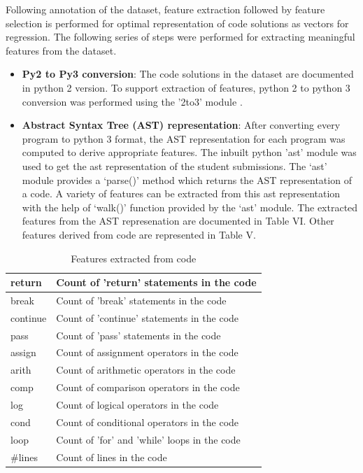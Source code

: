 \documentclass[conference]{IEEEtran}
\begin{document}
Following annotation of the dataset, feature extraction followed by feature selection is performed for optimal representation of code solutions as vectors for regression. The following series of steps were performed for extracting meaningful features from the dataset.

\begin{itemize}
        \item \textbf{Py2 to Py3 conversion}: The code solutions in the dataset are documented in python 2 version. To support extraction of features, python 2 to python 3 conversion was performed using the '2to3' module \cite{G}.
        \item \textbf{Abstract Syntax Tree (AST) representation}: After converting every program to python 3 format, the AST \cite{F} representation for each program was computed to derive appropriate features. The inbuilt python 'ast' module was used to get the ast representation of the student submissions. The ‘ast’ module provides a ‘parse()’ method which returns the AST representation of a code. A variety of features can be extracted from this ast representation with the help of ‘walk()’ function provided by the ‘ast’ module. The extracted features from the AST represenation are documented in Table VI. Other features derived from code are represented in Table V.
        
\end{itemize}

\begin{table}[h]
\centering
\begin{tabular}{|l|l|} 
\hline
return       & Count of 'return' statements in the code      \\ 
\hline
break        & Count of 'break' statements in the code       \\ 
\hline
continue     & Count of 'continue' statements in the code    \\ 
\hline
pass         & Count of 'pass' statements in the code        \\ 
\hline
assign       & Count of assignment operators in the code     \\ 
\hline
arith        & Count of arithmetic operators in the code     \\ 
\hline
comp         & Count of comparison operators in the code     \\ 
\hline
log          & Count of logical operators in the code        \\ 
\hline
cond         & Count of conditional operators in the code    \\ 
\hline
loop         & Count of 'for' and 'while' loops in the code  \\ 
\hline
\#lines      & Count of lines in the code                    \\ 
\hline
\end{tabular}

\caption{Features extracted from code}
\end{table}
\end{document}
